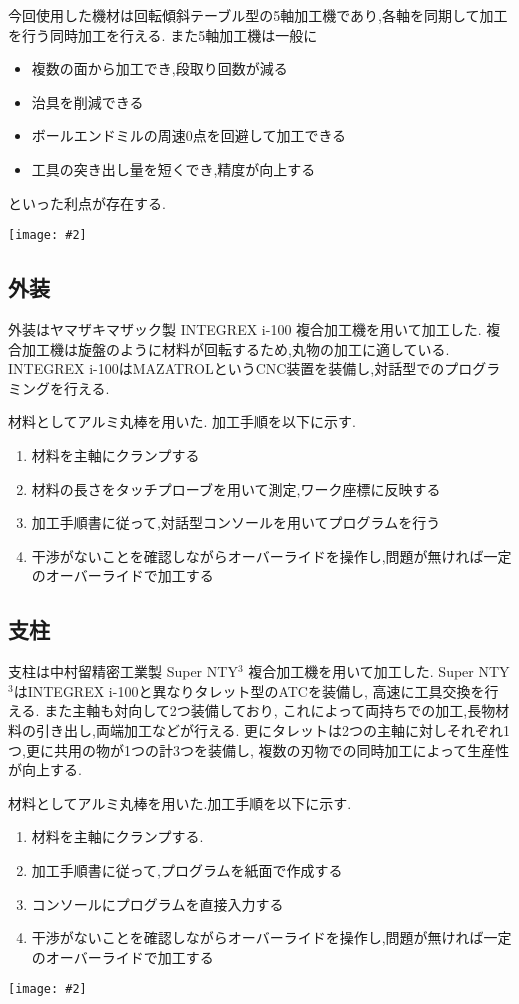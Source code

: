 \documentclass[uplatex,a4j,11pt,dvipdfmx]{jsreport}
\makeatletter
\def\fgcaption{\def\@captype{figure}\caption}
\newcommand{\mfig}[3][width=15cm]{
\begin{center}
\texttt{[image: \#2]}
\fgcaption{#3 \label{fig:#2}}
\end{center}
}
\makeatother
\begin{document}
  今回使用した機材は回転傾斜テーブル型の5軸加工機であり,各軸を同期して加工を行う同時加工を行える.
  また5軸加工機は一般に
  \begin{itemize}
    \item 複数の面から加工でき,段取り回数が減る
    \item 治具を削減できる
    \item ボールエンドミルの周速0点を回避して加工できる
    \item 工具の突き出し量を短くでき,精度が向上する
  \end{itemize}
  といった利点が存在する.\cite{5jiku}
  \mfig[width=8cm]{fig/kaitenkeisya.png}{回転傾斜テーブル型5軸加工機\cite{5jiku}}
  \subsection{外装}
  外装はヤマザキマザック製 INTEGREX i-100 複合加工機を用いて加工した.
  複合加工機は旋盤のように材料が回転するため,丸物の加工に適している.
  INTEGREX i-100はMAZATROLというCNC装置を装備し,対話型でのプログラミングを行える.
  
  材料としてアルミ丸棒を用いた.
  加工手順を以下に示す.
  \begin{enumerate}
    \item 材料を主軸にクランプする
    \item 材料の長さをタッチプローブを用いて測定,ワーク座標に反映する
    \item 加工手順書に従って,対話型コンソールを用いてプログラムを行う
    \item 干渉がないことを確認しながらオーバーライドを操作し,問題が無ければ一定のオーバーライドで加工する
  \end{enumerate}
  \subsection{支柱}
  支柱は中村留精密工業製 Super NTY$^3$ 複合加工機を用いて加工した.
  Super NTY$^3$はINTEGREX i-100と異なりタレット型のATCを装備し,
  高速に工具交換を行える.
  また主軸も対向して2つ装備しており,
  これによって両持ちでの加工,長物材料の引き出し,両端加工などが行える.
  更にタレットは2つの主軸に対しそれぞれ1つ,更に共用の物が1つの計3つを装備し,
  複数の刃物での同時加工によって生産性が向上する.

  材料としてアルミ丸棒を用いた.加工手順を以下に示す.
  \begin{enumerate}
    \item 材料を主軸にクランプする.
    \item 加工手順書に従って,プログラムを紙面で作成する
    \item コンソールにプログラムを直接入力する
    \item 干渉がないことを確認しながらオーバーライドを操作し,問題が無ければ一定のオーバーライドで加工する
  \end{enumerate}
  \mfig[width=8cm]{fig/nty3.png}{Super NTY$^3$のタレットと主軸}
\end{document}
